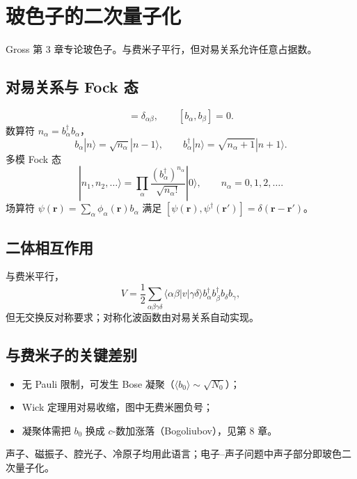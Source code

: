 \section{玻色子的二次量子化}

Gross 第 3 章专论玻色子。与费米子平行，但对易关系允许任意占据数。

\subsection{对易关系与 Fock 态}

\begin{equation}
  [b_\alpha,b_\beta^\dagger]=\delta_{\alpha\beta},
  \qquad
  [b_\alpha,b_\beta]=0.
\end{equation}
数算符 $n_\alpha=b_\alpha^\dagger b_\alpha$，
\begin{equation}
  b_\alpha|n\rangle=\sqrt{n_\alpha}|n-1\rangle,
  \qquad
  b_\alpha^\dagger|n\rangle=\sqrt{n_\alpha+1}|n+1\rangle.
\end{equation}
多模 Fock 态
\begin{equation}
  |n_1,n_2,\ldots\rangle
  =\prod_\alpha
  \frac{(b_\alpha^\dagger)^{n_\alpha}}{\sqrt{n_\alpha!}}
  |0\rangle,
  \qquad
  n_\alpha=0,1,2,\ldots.
\end{equation}
场算符 $\psi(\mathbf{r})=\sum_\alpha\phi_\alpha(\mathbf{r})b_\alpha$ 满足
$[\psi(\mathbf{r}),\psi^\dagger(\mathbf{r}')]=\delta(\mathbf{r}-\mathbf{r}')$。

\subsection{二体相互作用}

与费米平行，
\begin{equation}
  V
  =\frac12\sum_{\alpha\beta\gamma\delta}
  \langle\alpha\beta|v|\gamma\delta\rangle
  b_\alpha^\dagger b_\beta^\dagger b_\delta b_\gamma,
\end{equation}
但无交换反对称要求；对称化波函数由对易关系自动实现。

\subsection{与费米子的关键差别}

\begin{itemize}
  \item 无 Pauli 限制，可发生 Bose 凝聚（$\langle b_0\rangle\sim\sqrt{N_0}$）；
  \item Wick 定理用对易收缩，图中无费米圈负号；
  \item 凝聚体需把 $b_0$ 换成 $c$-数加涨落（Bogoliubov），见第 8 章。
\end{itemize}
声子、磁振子、腔光子、冷原子均用此语言；电子--声子问题中声子部分即玻色二次量子化。
